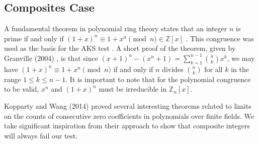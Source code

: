 \documentclass{article}
\theoremstyle{plain}
\theoremstyle{definition}
\newcommand{\Z}{\mathbb{Z}}
\begin{document}
\subsection{Composites Case}

A fundamental theorem in polynomial ring theory states that an integer $n$ is prime if and only if $(1 + x)^n \equiv 1 + x^n \pmod{n} \in \Z[x]$ \cite{granville2004primes}. This congruence was used as the basis for the AKS test \cite{aks2002}. A short proof of the theorem, given by Granville (2004) \cite{granville2004primes}, is that since $(x + 1)^n - (x^n + 1) = \sum_{k=1}^{n-1} \binom{n}{k} x^k$, we may have $(1 + x)^n \equiv 1 + x^n \pmod{n}$ if and only if $n$ divides $\binom{n}{k}$ for all $k$ in the range $1 \leq k \leq n-1$. It is important to note that for the polynomial congruence to be valid, $x^n$ and $(1+x)^n$ must be irreducible in $\Z_n[x]$.

Kopparty and Wang (2014) \cite{koppartywang2014roots} proved several interesting theorems related to limits on the counts of consecutive zero coefficients in polynomials over finite fields. We take significant inspiration from their approach to show that composite integers will always fail our test.
\end{document}
